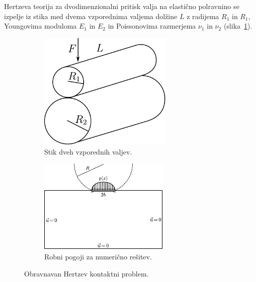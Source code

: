 \documentclass[12pt,a4paper,twoside]{article}
\theoremstyle{definition} %
\theoremstyle{plain} %
\numberwithin{equation}{section}
\begin{document}
Hertzeva teorija za dvodimenzionalni pritisk valja na elastično polravnino se izpelje iz stika med
dvema vzporednima valjema dolžine $L$ z radijema $R_1$ in $R_1$, Youngovima moduloma $E_1$ in $E_2$
in Poissonovima razmerjema $\nu_1$ in $\nu_2$ (slika~\ref{fig:hetzian-two-cylinders}).

\begin{figure}[h!]
  \centering
  \begin{subfigure}[t]{0.40\textwidth}
    \includegraphics[width=0.7\textwidth]{images/hertzian_two_cylinders.pdf}
    \caption{Stik dveh vzporednih valjev.}
    \label{fig:hetzian-two-cylinders}
  \end{subfigure}
  \begin{subfigure}[t]{0.50\textwidth}
    \includegraphics[width=\textwidth]{images/hertzian_analytical_setup.pdf}
    \caption{Robni pogoji za numerično rešitev.}
    \label{fig:hertz-analytical-setup}
  \end{subfigure}
  \caption{Obravnavan Hertzev kontaktni problem.}
  \label{fig:hertz-skica}
\end{figure}
\end{document}
